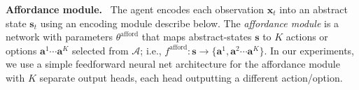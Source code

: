 \documentclass[nohyperref]{article}
\theoremstyle{plain}
\theoremstyle{definition}
\theoremstyle{remark}
\renewcommand{\paragraph}[1]{\textbf{#1}\ }
\newcommand{\obs}{\mathbf{x}}
\newcommand{\state}{\mathbf{s}}
\newcommand{\action}{\mathbf{a}}
\newcommand{\actionspace}{\mathcal{A}}
\newcommand{\afford}{\mathrm{afford}}
\newcommand{\fafford}{f^{\afford}}
\newcommand{\thetaafford}{\theta^{\afford}}
\begin{document}
\paragraph{Affordance module.}
The agent encodes each observation $\obs_t$ into an abstract state $\state_t$ using an encoding module describe below.  The \emph{affordance module} is a network with parameters $\thetaafford$ that maps abstract-states $\state$ to $K$ actions or options $\action^1 \cdots \action^K$ selected from $\actionspace$; i.e., 
$\fafford: \state \rightarrow \{ \action^1, \action^2 \cdots \action^K \}$.
In our experiments, we use a simple feedforward neural net architecture for the affordance module %
with $K$ separate output heads, each head outputting a different action/option.  
\end{document}
